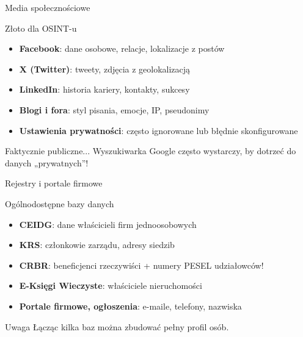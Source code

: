 \begin{frame}{Media społecznościowe}
\begin{block}{Złoto dla OSINT-u}
\begin{itemize}
  \item \textbf{Facebook}: dane osobowe, relacje, lokalizacje z postów
  \item \textbf{X (Twitter)}: tweety, zdjęcia z geolokalizacją
  \item \textbf{LinkedIn}: historia kariery, kontakty, sukcesy
  \item \textbf{Blogi i fora}: styl pisania, emocje, IP, pseudonimy
  \item \textbf{Ustawienia prywatności}: często ignorowane lub błędnie skonfigurowane \cite{zrodlo} \cite{zrodloArtykul}
\end{itemize}
\end{block}
\pause
\begin{exampleblock}{Faktycznie publiczne...}
Wyszukiwarka Google często wystarczy, by dotrzeć do danych „prywatnych”!
\end{exampleblock}
\end{frame}

\begin{frame}{Rejestry i portale firmowe}
\begin{block}{Ogólnodostępne bazy danych}
\begin{itemize}
  \item \textbf{CEIDG}: dane właścicieli firm jednoosobowych
  \item \textbf{KRS}: członkowie zarządu, adresy siedzib
  \item \textbf{CRBR}: beneficjenci rzeczywiści + numery PESEL udziałowców!
  \item \textbf{E-Księgi Wieczyste}: właściciele nieruchomości
  \item \textbf{Portale firmowe, ogłoszenia}: e-maile, telefony, nazwiska \cite{zrodloDzialalnosc}
\end{itemize}
\end{block}
\pause
\begin{alertblock}{Uwaga}
Łącząc kilka baz można zbudować pełny profil osób.
\end{alertblock}
\end{frame}

